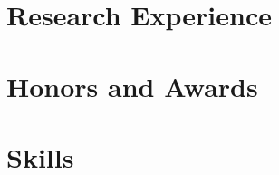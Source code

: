 \documentclass{resume}
\begin{document}
\section{Research Experience}




\section{Honors and Awards}

\begin{enumerate}[label={[\arabic*]},nosep]
  \item 
  \item 
  \item 
\end{enumerate}


\section{Skills}


\end{document}
